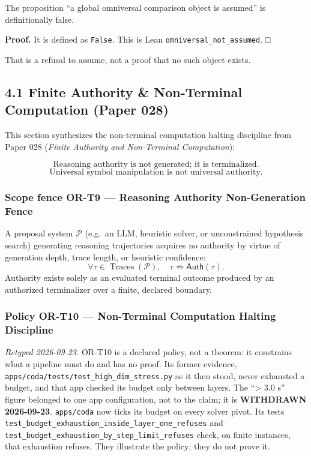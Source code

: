 \documentclass[
  11pt,
]{article}
\begin{document}
The proposition ``a global omniversal comparison object is assumed'' is definitionally false.

\textbf{Proof.} It is defined as \texttt{False}. This is Lean \nolinkurl{omniversal_not_assumed}. □

That is a refusal to assume, not a proof that no such object exists.

\subsection{4.1 Finite Authority \& Non-Terminal Computation (Paper 028)}\label{finite-authority-non-terminal-computation-paper-028}

This section synthesizes the non-terminal computation halting discipline from Paper 028 (\emph{Finite Authority and Non-Terminal Computation}):

\[\boxed{ \text{Reasoning authority is not generated; it is terminalized.} }\] \[\boxed{ \text{Universal symbol manipulation is not universal authority.} }\]

\subsubsection{Scope fence OR-T9 --- Reasoning Authority Non-Generation Fence}\label{scope-fence-or-t9-reasoning-authority-non-generation-fence}

A proposal system \(\mathcal{P}\) (e.g.~an LLM, heuristic solver, or unconstrained hypothesis search) generating reasoning trajectories acquires no authority by virtue of generation depth, trace length, or heuristic confidence: \[\forall \tau \in \operatorname{Traces}(\mathcal{P}), \quad \tau \not\Rightarrow \mathsf{Auth}(\tau).\] Authority exists solely as an evaluated terminal outcome produced by an authorized terminalizer over a finite, declared boundary.

\subsubsection{Policy OR-T10 --- Non-Terminal Computation Halting Discipline}\label{policy-or-t10-non-terminal-computation-halting-discipline}

\emph{Retyped 2026-09-23.} OR-T10 is a declared policy, not a theorem: it constrains what a pipeline must do and has no proof. Its former evidence, \nolinkurl{apps/coda/tests/test_high_dim_stress.py} as it then stood, never exhausted a budget, and that app checked its budget only between layers. The ``\textgreater{} 3.0 s'' figure belonged to one app configuration, not to the claim; it is \textbf{WITHDRAWN 2026-09-23}. \texttt{apps/coda} now ticks its budget on every solver pivot. Its tests \nolinkurl{test_budget_exhaustion_inside_layer_one_refuses} and \nolinkurl{test_budget_exhaustion_by_step_limit_refuses} check, on finite instances, that exhaustion refuses. They illustrate the policy; they do not prove it.
\end{document}

